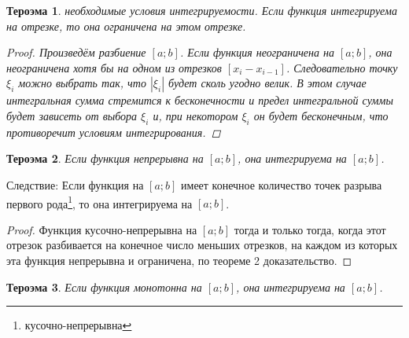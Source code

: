 \documentclass[oneside]{book}
\newtheorem{thm}{Тероэма}[chapter] %
\begin{document}
\begin{enumerate}
\begin{itemize}
\begin{enumerate}
\begin{thm}
  необходимые условия интегрируемости. Если функция интегрируема на отрезке, то она ограничена на этом отрезке.
  \begin{proof}
    Произведём разбиение $[a;b]$. Если функция неограничена на $[a;b]$, она неограничена хотя бы на одном из отрезков $[x_i - x_{i-1}]$.
    Следовательно точку $\xi_i$ можно выбрать так, что  $|\xi_i|$ будет сколь угодно велик. В этом случае интегральная сумма стремится
    к бесконечности и предел интегральной суммы будет зависеть от выбора $\xi_i$ и, при некотором $\xi_i$ он будет бесконечным,
    что противоречит условиям интегрирования.
  \end{proof}
\end{thm}

\begin{thm}
  Если функция непрерывна на $[a;b]$, она интегрируема на $[a;b]$.
\end{thm}
Следствие: Если функция на $[a;b]$ имеет конечное количество точек разрыва первого рода\footnote{кусочно-непрерывна}, то она интегрируема на $[a;b]$.
\begin{proof}
  Функция кусочно-непрерывна на $[a;b]$ тогда и только тогда, когда этот отрезок разбивается на конечное число меньших отрезков,
  на каждом из которых эта функция непрерывна и ограничена, по теореме 2 доказательство.
\end{proof}

\begin{thm}
  Если функция монотонна на $[a;b]$, она интегрируема на $[a;b]$.
\end{thm}


\end{enumerate}
\end{itemize}
\end{enumerate}
\end{document}
